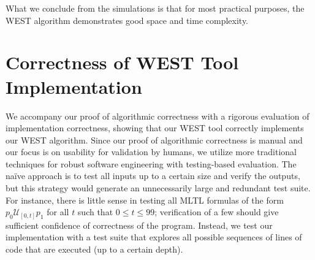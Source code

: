 \documentclass[runningheads]{llncs}
\begin{document}
What we conclude from the simulations is that for most practical purposes, the WEST algorithm demonstrates good space and time complexity.
\section{Correctness of WEST Tool Implementation} \label{test}
We accompany our proof of algorithmic correctness with a rigorous evaluation of implementation correctness, showing that our WEST tool correctly implements our WEST algorithm. Since our proof of algorithmic correctness is manual and our focus is on usability for validation by humans, we utilize more traditional techniques for robust software engineering with testing-based evaluation. 
The na\"ive approach is to test all inputs up to a certain size and verify the outputs, but this strategy would generate an unnecessarily large and redundant test suite. 
For instance, there is little sense in testing all MLTL formulas of the form $p_0 \mathcal{U}_{[0,t]} p_1$ for all $t$ such that $0 \leq t \leq 99$; verification of a few should give sufficient confidence of correctness of the program. 
Instead, we test our implementation with a test suite that explores all possible sequences of lines of code that are executed (up to a certain depth).
\end{document}
